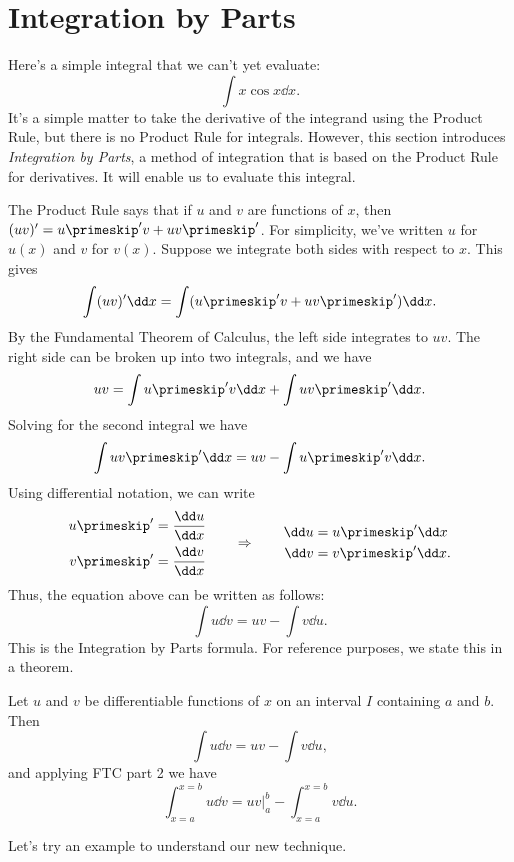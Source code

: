 \section{Integration by Parts}\label{sec:IBP}

Here's a simple integral that we can't yet evaluate:
\[\int x\cos x\dd x.\]
It's a simple matter to take the derivative of the integrand using the Product Rule, but there is no Product Rule for integrals.  However, this section introduces \emph{Integration by Parts}, a method of integration that is based on the Product Rule for derivatives. It will enable us to evaluate this integral.

The Product Rule says that if $u$ and $v$ are functions of $x$, then  $(uv)' = u\primeskip'v + uv\primeskip'$.  For simplicity, we've written $u$ for $u(x)$ and $v$ for $v(x)$.  Suppose we integrate both sides with respect to $x$.  This gives
\[\int (uv)'\dd x = \int (u\primeskip'v+uv\primeskip')\dd x.\]
By the Fundamental Theorem of Calculus, the left side integrates to $uv$.  The right side can be broken up into two integrals, and we have
\[uv = \int u\primeskip'v\dd x + \int uv\primeskip'\dd x.\]
Solving for the second integral we have
\[\int uv\primeskip'\dd x = uv - \int u\primeskip'v\dd x.\]
Using differential notation, we can write
\[
\begin{aligned}
 u\primeskip'&=\frac{\dd u}{\dd x} \\
 v\primeskip'&=\frac{\dd v}{\dd x}
\end{aligned}
\qquad\Rightarrow\qquad
\begin{aligned}
 \dd u&=u\primeskip'\dd x \\
 \dd v&=v\primeskip'\dd x.
\end{aligned}
\]
Thus, the equation above can be written as follows:
\[\int u\dd v = uv - \int v\dd u.\]
This is the Integration by Parts formula. For reference purposes, we state this in a theorem.

\begin{theorem}\label{thm:IBP}%
Let $u$ and $v$ be differentiable functions of $x$ on an interval $I$ containing $a$ and $b$. Then 
\[\int u\dd v = uv - \int v\dd u,\]
and applying FTC part 2 we have 
\[\int_{x=a}^{x=b} u\dd v = uv\Big|_a^b - \int_{x=a}^{x=b}v\dd u.\]
\end{theorem}


Let's try an example to understand our new technique.

